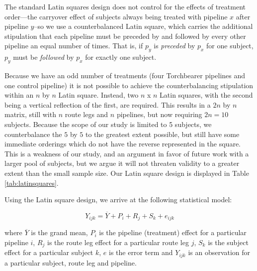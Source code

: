 The standard Latin squares design does not control for the effects of treatment order---the carryover effect of subjects always being treated with pipeline $x$ after pipeline $y$--so we use a counterbalanced Latin square, which carries the additional stipulation that each pipeline must be preceded by and followed by every other pipeline an equal number of times. That is, if $p_y$ is \textit{preceded} by $p_x$ for one subject, $p_y$ must be \textit{followed} by $p_x$ for exactly one subject.

Because we have an odd number of treatments (four Torchbearer pipelines and one control pipeline) it is not possible to achieve the counterbalancing stipulation within an $n$ by $n$ Latin square. Instead, two $n$ x $n$ Latin squares, with the second being a vertical reflection of the first, are required. This results in a $2n$ by $n$ matrix, still with $n$ route legs and $n$ pipelines, but now requiring $2n = 10$ subjects. Because the scope of our study is limited to 5 subjects, we counterbalance the $5$ by $5$ to the greatest extent possible, but still have some immediate orderings which do not have the reverse represented in the square. This is a weakness of our study, and an argument in favor of future work with a larger pool of subjects, but we argue it will not threaten validity to a greater extent than the small sample size. Our Latin square design is displayed in Table \ref{tab:latinsquares}.

Using the Latin square design, we arrive at the following statistical model:

\begin{equation}\label{eq:model}
    Y_{ijk} = \overline{Y} + P_i + R_j + S_k + e_{ijk}
\end{equation}

where $\overline{Y}$ is the grand mean, $P_i$ is the pipeline (treatment) effect for a particular pipeline $i$, $R_j$ is the route leg effect for a particular route leg $j$, $S_k$ is the subject effect for a particular subject $k$, $e$ is the error term and $Y_{ijk}$ is an observation for a particular subject, route leg and pipeline.

